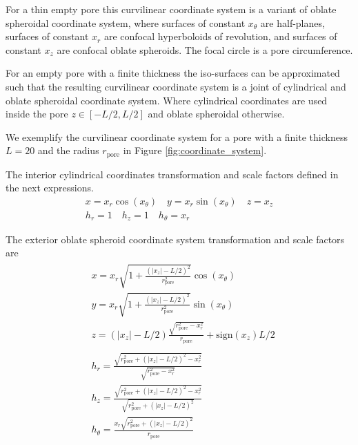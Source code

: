 \documentclass[10pt, a4paper]{article}
\newcommand{\sign}{\text{sign}}
\begin{document}
\begin{multicols}{2}
For a thin empty pore this curvilinear coordinate system is a variant of oblate spheroidal coordinate system, where surfaces of constant $x_{\theta}$ are half-planes, surfaces of constant $x_{r}$ are confocal hyperboloids of revolution, and surfaces of constant $x_{z}$ are confocal oblate spheroids. The focal circle is a pore circumference.

For an empty pore with a finite thickness the iso-surfaces can be approximated such that the resulting curvilinear coordinate system is a joint of cylindrical and oblate spheroidal coordinate system.
Where cylindrical coordinates are used inside the pore $z \in [-L/2, L/2]$ and oblate spheroidal otherwise.

We exemplify the curvilinear coordinate system for a pore with a finite thickness $L=20$ and the radius $r_{\textrm{pore}}$ in Figure \ref{fig:coordinate_system}.

The interior cylindrical coordinates transformation and scale factors defined in the next expressions.
\begin{gather}
    \label{eq:cyl_transformation_1}
    x = x_r \cos(x_{\theta}) \quad
    y = x_r \sin(x_{\theta}) \quad
    z = x_z
    \\
    \label{eq:cyl_transformation_2}
    h_r = 1 \quad
    h_z = 1 \quad
    h_{\theta} = x_r
\end{gather}

The exterior oblate spheroid coordinate system transformation and scale factors are
\begin{gather}
    \begin{aligned}\label{eq:oblate_spheroid_transformation_1}
        &x = x_r
        \sqrt{1+\frac{(|x_z|-L/2)^2}{r_{\textrm{pore}}^2}}
        \cos(x_{\theta})
        \\
        &y = x_r
        \sqrt{1+\frac{(|x_z|-L/2)^2}{r_{\textrm{pore}}^2}}
        \sin(x_{\theta})
        \\
        &z = (|x_z|-L/2) \frac{\sqrt{r_{\textrm{pore}}^2 - x_r^2}}{r_{\textrm{pore}}} + \sign(x_z) L/2 
    \end{aligned}
    \\[4pt]
    \begin{aligned}\label{eq:oblate_spheroid_transformation_2}
        &h_r = \frac{\sqrt{r_{\textrm{pore}}^2 + (|x_z|-L/2)^2 - x_r^2}}{\sqrt{r_{\textrm{pore}}^2 - x_r^2}}
        \\
        &h_z = \frac{\sqrt{r_{\textrm{pore}}^2 + (|x_z|-L/2)^2 - x_r^2}}{\sqrt{r_{\textrm{pore}}^2 + (|x_z|-L/2)^2}}
        \\
        &h_{\theta} = \frac{x_r \sqrt{r_{\textrm{pore}}^2 + (|x_z|-L/2)^2}}{r_{\textrm{pore}}}
    \end{aligned}
\end{gather}


\end{multicols}
\end{document}
